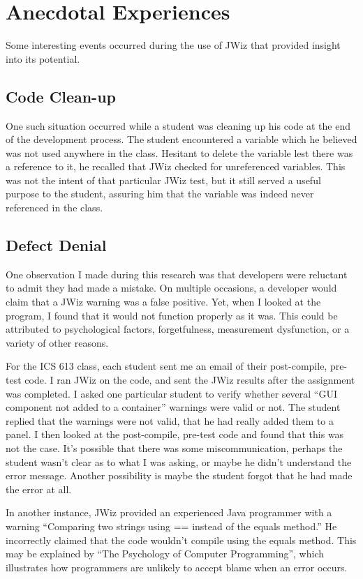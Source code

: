 \section{Anecdotal Experiences}
Some interesting events occurred during the use of JWiz that provided
insight into its potential.  

\subsection{Code Clean-up}
One such situation occurred while a student was cleaning up his code at the
end of the development process.  The student encountered a variable which
he believed was not used anywhere in the class.  Hesitant to delete the
variable lest there was a reference to it, he recalled that JWiz checked
for unreferenced variables.  This was not the intent of that particular
JWiz test, but it still served a useful purpose to the student, assuring
him that the variable was indeed never referenced in the class.

\subsection{Defect Denial}
One observation I made during this research was that developers were
reluctant to admit they had made a mistake.  On multiple occasions, a
developer would claim that a JWiz warning was a false positive. Yet, when I
looked at the program, I found that it would not function properly as it
was.  This could be attributed to psychological factors\cite{Weinberg71},
forgetfulness\cite{Anderson85}, measurement dysfunction\cite{Austin96}, or
a variety of other reasons.

For the ICS 613 class, each student sent me an email of their post-compile,
pre-test code.  I ran JWiz on the code, and sent the JWiz results after the
assignment was completed.  I asked one particular student to verify whether
several ``GUI component not added to a container'' warnings were valid or
not.  The student replied that the warnings were not valid, that he had
really added them to a panel.  I then looked at the post-compile, pre-test
code and found that this was not the case.  It's possible that there was
some miscommunication, perhaps the student wasn't clear as to what I was
asking, or maybe he didn't understand the error message.  Another
possibility is maybe the student forgot that he had made the error at
all\cite{Anderson85}.

In another instance, JWiz provided an experienced Java programmer with a
warning ``Comparing two strings using == instead of the equals method.''
He incorrectly claimed that the code wouldn't compile using the equals
method.  This may be explained by ``The Psychology of Computer
Programming''\cite{Weinberg71}, which illustrates how programmers are
unlikely to accept blame when an error occurs.

